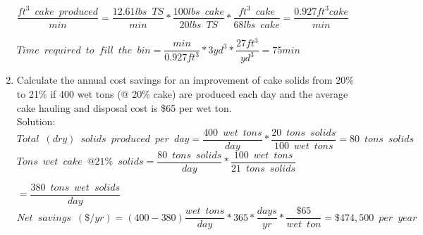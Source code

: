 \documentclass{article}
\begin{document}
\begin{enumerate}
{$\dfrac{ft^3 \enspace cake \enspace produced}{min}=\dfrac{12.61lbs \enspace TS}{min}*\dfrac{100 lbs \enspace cake}{20lbs \enspace TS}*\dfrac{ft^3 \enspace cake}{68 lbs \enspace cake} = \dfrac{0.927ft^3 cake}{min}$}\\
\vspace{3mm}

{$Time \enspace required \enspace to \enspace fill \enspace the \enspace bin=\dfrac{min}{0.927ft^3}*{3yd^3}*\dfrac{27ft^3}{yd^3}=\boxed{75min}$}\\
\pagebreak
\item Calculate the annual cost savings for an improvement of cake solids from 20\% to 21\% if 400 wet tons (@ 20\% cake) are produced each day and the average cake hauling and disposal cost is \$65 per wet ton.\\
Solution:\\
{$Total \enspace (dry)\enspace solids \enspace produced \enspace per \enspace day =\dfrac{400 \enspace wet \enspace tons}{day}*\dfrac{20  \enspace tons \enspace solids}{100  \enspace wet \enspace tons}={80  \enspace tons \enspace solids}$}\\
\vspace{3mm}
{$Tons \enspace wet \enspace cake \enspace@ 21\% \enspace solids =\dfrac{80 \enspace tons \enspace solids}{day}*\dfrac{100  \enspace wet \enspace tons}{21  \enspace tons \enspace solids}$}

\vspace{3mm}
{$=\dfrac{380  \enspace tons \enspace  wet \enspace solids}{day}$}\\
\vspace{3mm}
{$Net \enspace savings \enspace (\$/yr) = (400 - 380)\dfrac{wet \enspace tons}{day}*365*\dfrac{days}{yr}*\dfrac{\$65}{wet \enspace ton}=\boxed{\$474,500 \enspace per  \enspace year}$}



\end{enumerate}
\end{document}
